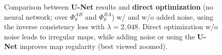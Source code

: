 \begin{figure}
   \caption{Comparison between \textbf{U-Net} results and \textbf{direct optimization} (no neural network; over $\Phi_\theta^{AB}$ and $\Phi_\theta^{BA}$) w/ and w/o added noise,  using the inverse consistency loss with $\lambda = 2,048$. Direct optimization w/o noise leads to irregular maps, while adding noise or using the \textbf{U-Net} improves map regularity (best viewed zoomed).} \label{fig:regularity_by_inexact_inverse_consistency}
     \vspace{-0.2cm}
\end{figure}

